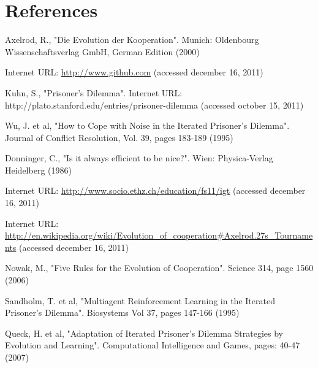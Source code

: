 \section{References}

\renewcommand{\refname}{}

\begin{thebibliography}{99}
		Axelrod, R., "Die Evolution der Kooperation". Munich: Oldenbourg Wissenschaftsverlag GmbH, German Edition (2000)

		Internet URL: \url{http://www.github.com} (accessed december 16, 2011)

		Kuhn, S., "Prisoner's Dilemma". Internet URL: http://plato.stanford.edu/entries/prisoner-dilemma (accessed october 15, 2011)



		Wu, J. et al, "How to Cope with Noise in the Iterated Prisoner's Dilemma". Journal of Conflict Resolution, Vol. 39, pages 183-189 (1995)

		Donninger, C., "Is it always efficient to be nice?". Wien: Physica-Verlag Heidelberg (1986)

		Internet URL: \url{http://www.socio.ethz.ch/education/fs11/igt} (accessed december 16, 2011)

		Internet URL: \url{http://en.wikipedia.org/wiki/Evolution_of_cooperation#Axelrod.27s_Tournaments} (accessed december 16, 2011)




		Nowak, M., "Five Rules for the Evolution of Cooperation".  Science 314, page 1560 (2006)





		Sandholm, T. et al, "Multiagent Reinforcement Learning in the Iterated Prisoner's Dilemma". Biosystems Vol 37, pages 147-166 (1995)

		Queck, H. et al, "Adaptation of Iterated Prisoner's Dilemma Strategies by Evolution and Learning". Computational Intelligence and Games, pages: 40-47 (2007)





\end{thebibliography}